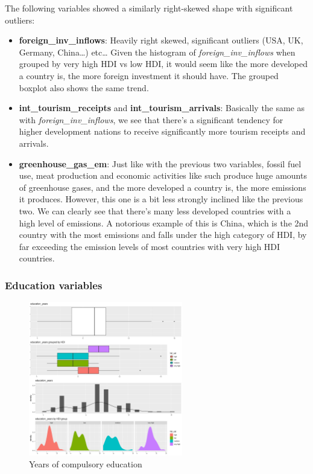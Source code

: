 \documentclass[]{article}
\providecommand{\tightlist}{%
  \setlength{\itemsep}{0pt}\setlength{\parskip}{0pt}}
\begin{document}
The following variables showed a similarly right-skewed shape with
significant outliers:

\begin{itemize}
\tightlist
\item
  \textbf{foreign\_inv\_inflows}: Heavily right skewed, significant
  outliers (USA, UK, Germany, China\ldots{}) etc\ldots{} Given the
  histogram of \emph{foreign\_inv\_inflows} when grouped by very high
  HDI vs low HDI, it would seem like the more developed a country is,
  the more foreign investment it should have. The grouped boxplot also
  shows the same trend.
\item
  \textbf{int\_tourism\_receipts} and \textbf{int\_tourism\_arrivals}:
  Basically the same as with \emph{foreign\_inv\_inflows}, we see that
  there's a significant tendency for higher development nations to
  receive significantly more tourism receipts and arrivals.
\item
  \textbf{greenhouse\_gas\_em}: Just like with the previous two
  variables, fossil fuel use, meat production and economic activities
  like such produce huge amounts of greenhouse gases, and the more
  developed a country is, the more emissions it produces. However, this
  one is a bit less strongly inclined like the previous two. We can
  clearly see that there's many less developed countries with a high
  level of emissions. A notorious example of this is China, which is the
  2nd country with the most emissions and falls under the high category
  of HDI, by far exceeding the emission levels of most countries with
  very high HDI countries.
\end{itemize}

\hypertarget{education-variables}{%
\subsubsection{Education variables}\label{education-variables}}

\begin{figure}
\centering
\includegraphics[width=0.6\textwidth,height=\textheight]{./img/education_years.png}
\caption{Years of compulsory education}
\end{figure}
\end{document}
